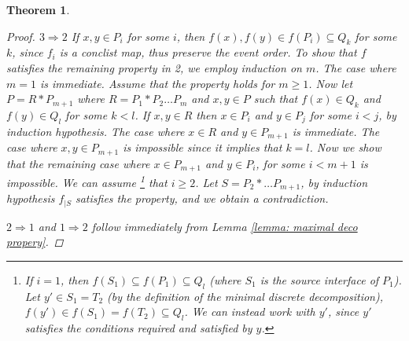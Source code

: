 \documentclass[11pt,a4paper,oldfontcommands]{memoir}
\newcommand*\rest[1]{{}_{| #1}}
\newtheorem{theorem}[definition]{Theorem}
\begin{document}
\begin{theorem}
\begin{proof}
 $3 \Rightarrow 2$ If $x,y \in P_i$ for some $i$, then $f(x),f(y)\in f(P_i)\subseteq Q_k$ for some $k$, since $f_i$ is a conclist map, thus preserve the event order.  %
To show that $f$ satisfies the remaining property in 2, we employ induction on $m$. The case where $m=1$ is immediate. Assume that the property holds for $m \geq 1$. Now let $P=R*P_{m+1}$ where $R=P_1*P_2 \dots P_m$ and $x,y \in P$ such that $f(x)\in Q_k$ and $f(y)\in Q_l$ for some $k<l$. If $x,y \in  R$ then $x \in P_i$ and $y \in P_j$ for some $ i < j $, by induction hypothesis. The case where $x\in  R$ and $y\in  P_{m+1}$ is immediate. The case where $x,y\in  P_{m+1}$ is impossible since it implies that $k=l$. Now we show that the remaining case where $x\in P_{m+1}$ and $y\in  P_i$, for some $i<m+1$ is impossible. We can assume \footnote{If $i=1$, then $f(S_1)\subseteq f(P_1) \subseteq Q_l$ (where $S_1$ is the source interface of $P_1$). Let $y' \in S_1=T_2$ (by the definition of the minimal discrete decomposition), $f(y')\in f(S_1)=f(T_2)\subseteq Q_l$. We can instead work with $y'$, since $y'$ satisfies the conditions required and satisfied by $y$. } that $i\geq 2$. Let $S=P_2*\dots P_{m+1}$, by induction hypothesis $f\rest{S}$ satisfies the property, and we obtain a contradiction. 

$2\Rightarrow 1$ and $1\Rightarrow 2$ follow immediately from Lemma \ref{lemma: maximal deco propery}.
\end{proof}
\end{theorem}
\end{document}
